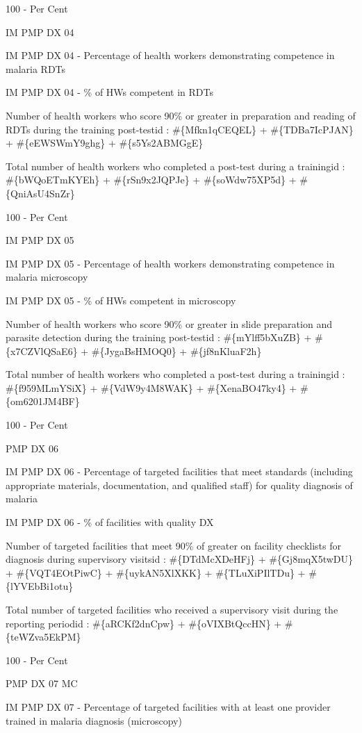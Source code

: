 \documentclass[]{book}
\begin{document}
100 - Per Cent

IM PMP DX 04

IM PMP DX 04 - Percentage of health workers demonstrating competence in malaria RDTs

IM PMP DX 04 - \% of HWs competent in RDTs

Number of health workers who score 90\% or greater in preparation and reading of RDTs during the training post-testid : \#\{Mfkn1qCEQEL\} + \#\{TDBa7IcPJAN\} + \#\{eEWSWmY9ghg\} + \#\{s5Ys2ABMGgE\}

Total number of health workers who completed a post-test during a trainingid : \#\{bWQoETmKYEh\} + \#\{rSn9x2JQPJe\} + \#\{soWdw75XP5d\} + \#\{QniAsU4SnZr\}

100 - Per Cent

IM PMP DX 05

IM PMP DX 05 - Percentage of health workers demonstrating competence in malaria microscopy

IM PMP DX 05 - \% of HWs competent in microscopy

Number of health workers who score 90\% or greater in slide preparation and parasite detection during the training post-testid : \#\{mYlff5bXuZB\} + \#\{x7CZVlQSaE6\} + \#\{JygaBsHMOQ0\} + \#\{jf8nKluaF2h\}

Total number of health workers who completed a post-test during a trainingid : \#\{f959MLmYSiX\} + \#\{VdW9y4M8WAK\} + \#\{XenaBO47ky4\} + \#\{om6201JM4BF\}

100 - Per Cent

PMP DX 06

IM PMP DX 06 - Percentage of targeted facilities that meet standards (including appropriate materials, documentation, and qualified staff) for quality diagnosis of malaria

IM PMP DX 06 - \% of facilities with quality DX

Number of targeted facilities that meet 90\% of greater on facility checklists for diagnosis during supervisory visitsid : \#\{DTdMcXDeHFj\} + \#\{Gj8mqX5twDU\} + \#\{VQT4EOtPiwC\} + \#\{uykAN5XlXKK\} + \#\{TLuXiPIlTDu\} + \#\{lYVEbBi1otu\}

Total number of targeted facilities who received a supervisory visit during the reporting periodid : \#\{aRCKf2dnCpw\} + \#\{oVIXBtQccHN\} + \#\{teWZva5EkPM\}

100 - Per Cent

PMP DX 07 MC

IM PMP DX 07 - Percentage of targeted facilities with at least one provider trained in malaria diagnosis (microscopy)
\end{document}
